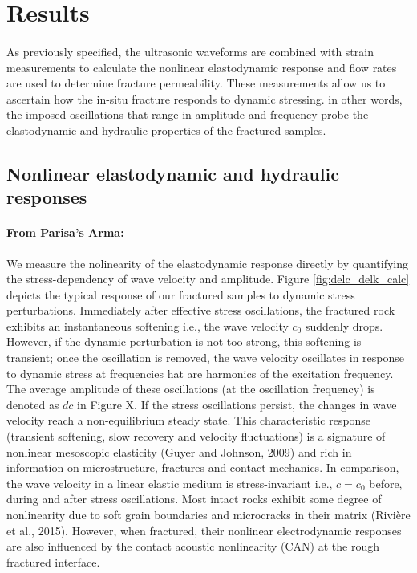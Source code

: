 \documentclass[letterpaper,10pt]{article}
\begin{document}
\newpage



\section{Results}
\paragraph{}
As previously specified, the ultrasonic waveforms are combined with strain measurements to calculate the nonlinear elastodynamic response and flow rates are used to determine fracture permeability. These measurements allow us to ascertain how the in-situ fracture responds to dynamic stressing. in other words, the imposed oscillations that range in amplitude and frequency probe the elastodynamic and hydraulic properties of the fractured samples. 

\subsection{Nonlinear elastodynamic and hydraulic responses}
\paragraph{From Parisa's Arma:}
We measure the nolinearity of the elastodynamic response directly by quantifying the stress-dependency of wave velocity and amplitude. Figure \ref{fig:delc_delk_calc} depicts the typical response of our fractured samples to dynamic stress perturbations. Immediately after effective stress oscillations, the fractured rock exhibits an instantaneous softening i.e., the wave velocity $c_0$ suddenly drops. However, if the dynamic perturbation is not too strong, this softening is transient; once the oscillation is removed, the wave velocity oscillates in response to dynamic stress at frequencies hat are harmonics of the excitation frequency. The average amplitude of these oscillations (at the oscillation frequency) is denoted as $dc$ in Figure X. If the stress oscillations persist, the changes in wave velocity reach a non-equilibrium steady state. This characteristic response (transient softening, slow recovery and velocity fluctuations) is a signature of nonlinear mesoscopic elasticity (Guyer and Johnson, 2009) and rich in information on microstructure, fractures and contact mechanics. In comparison, the wave velocity in a linear elastic medium is stress-invariant i.e., $c = c_0$ before, during and after stress oscillations. Most intact rocks exhibit some degree of nonlinearity due to soft grain boundaries and microcracks in their matrix (Rivière et al., 2015). However, when fractured, their nonlinear electrodynamic responses are also influenced by the contact acoustic nonlinearity (CAN) at the rough fractured interface.  
\end{document}
